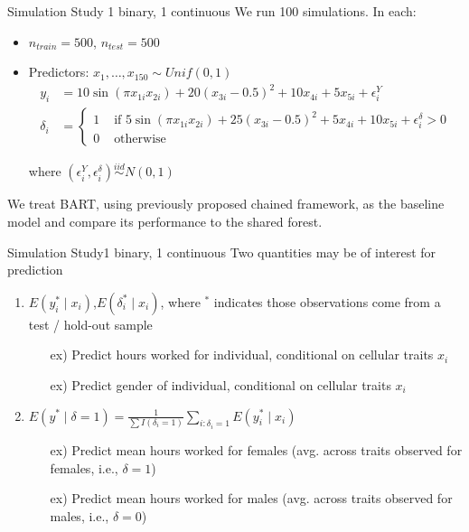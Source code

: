 \documentclass{beamer}
\begin{document}
\begin{frame}{Simulation Study }{1 binary, 1 continuous}
We run 100 simulations. In each:
\begin{itemize}
\item $n_{train} = 500$, $n_{test} = 500$
\item Predictors: $x_1, \hdots, x_{150} \sim Unif(0,1)$
\begin{align*}
y_i &= 10 \sin (\pi x_{1i} x_{2i}) + 20(x_{3i} - 0.5)^2 + 10x_{4i} + 5x_{5i} +
\epsilon_i^Y\\
\delta_i &= \begin{cases}1 &\text{ if }5 \sin (\pi x_{1i} x_{2i}) + 25(x_{3i} - 0.5)^2 + 5x_{4i} + 10x_{5i} +
\epsilon_i^{\delta} > 0 \\
                          0 & \text{ otherwise}\end{cases}
\end{align*}

where $(\epsilon_i^Y, \epsilon_i^{\delta}) \overset{iid}{\sim} N(0,1)$

\end{itemize}

\noindent We treat BART, using previously proposed chained framework, as the baseline model and compare its performance to the shared forest. %


\end{frame}

\begin{frame}{Simulation Study}{1 binary, 1 continuous }
Two quantities may be of interest for prediction
\begin{enumerate}
\item $E( y_i^* \mid x_i)$,$E(\delta_i^* \mid x_i)$, where $^*$ indicates those observations come from a test / hold-out sample
  \begin{itemize}
    \item[ex)] Predict hours worked for individual, conditional on cellular traits $x_i$
    \item[ex)] Predict gender of individual, conditional on cellular traits $x_i$
  \end{itemize}
\item $E(y^* \mid \delta = 1) = \frac{1}{\sum I(\delta_i = 1)}\sum_{i: \delta_i = 1}E(y_i^* \mid x_i)$
  \begin{itemize}
    \item[ex)] Predict mean hours worked for females (avg. across traits observed for females, i.e., $\delta = 1$)
    \item[ex)] Predict mean hours worked for males (avg. across traits observed for males, i.e., $\delta = 0$)
  \end{itemize}
\end{enumerate}
\end{frame}
\end{document}

